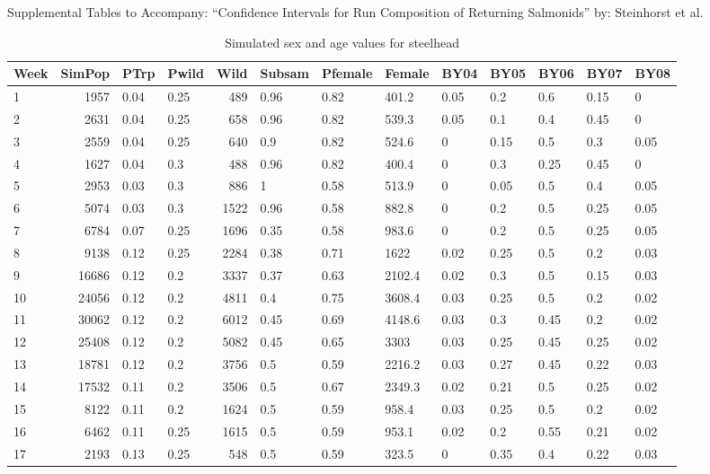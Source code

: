 \documentclass[12pt]{article}
\begin{document}
\begin{center}
\LARGE 
Supplemental Tables to Accompany:\linebreak
``Confidence Intervals for Run Composition\linebreak
of Returning Salmonids''\linebreak
by: Steinhorst et al.
\end{center}

\begin{table}[H]
\caption{Simulated sex and age values for steelhead}
\label{table:SHsim}
\begin{tabular}{ | l | r | l | l | r | l | l | l | l |l | l | l | l | }
\hline
Week&SimPop&PTrp&Pwild&Wild&Subsam&Pfemale&Female&BY04&BY05&BY06&BY07&BY08 \\ \hline
1&1957&0.04&0.25&489&0.96&0.82&401.2&0.05&0.2&0.6&0.15&0 \\ \hline
2&2631&0.04&0.25&658&0.96&0.82&539.3&0.05&0.1&0.4&0.45&0 \\ \hline
3&2559&0.04&0.25&640&0.9&0.82&524.6&0&0.15&0.5&0.3&0.05 \\ \hline
4&1627&0.04&0.3&488&0.96&0.82&400.4&0&0.3&0.25&0.45&0 \\ \hline
5&2953&0.03&0.3&886&1&0.58&513.9&0&0.05&0.5&0.4&0.05 \\ \hline
6&5074&0.03&0.3&1522&0.96&0.58&882.8&0&0.2&0.5&0.25&0.05 \\ \hline
7&6784&0.07&0.25&1696&0.35&0.58&983.6&0&0.2&0.5&0.25&0.05 \\ \hline
8&9138&0.12&0.25&2284&0.38&0.71&1622&0.02&0.25&0.5&0.2&0.03 \\ \hline
9&16686&0.12&0.2&3337&0.37&0.63&2102.4&0.02&0.3&0.5&0.15&0.03 \\ \hline
10&24056&0.12&0.2&4811&0.4&0.75&3608.4&0.03&0.25&0.5&0.2&0.02 \\ \hline
11&30062&0.12&0.2&6012&0.45&0.69&4148.6&0.03&0.3&0.45&0.2&0.02 \\ \hline
12&25408&0.12&0.2&5082&0.45&0.65&3303&0.03&0.25&0.45&0.25&0.02 \\ \hline
13&18781&0.12&0.2&3756&0.5&0.59&2216.2&0.03&0.27&0.45&0.22&0.03 \\ \hline
14&17532&0.11&0.2&3506&0.5&0.67&2349.3&0.02&0.21&0.5&0.25&0.02 \\ \hline
15&8122&0.11&0.2&1624&0.5&0.59&958.4&0.03&0.25&0.5&0.2&0.02 \\ \hline
16&6462&0.11&0.25&1615&0.5&0.59&953.1&0.02&0.2&0.55&0.21&0.02 \\ \hline
17&2193&0.13&0.25&548&0.5&0.59&323.5&0&0.35&0.4&0.22&0.03 \\ \hline

\end{tabular}
\end{table}
\end{document}

